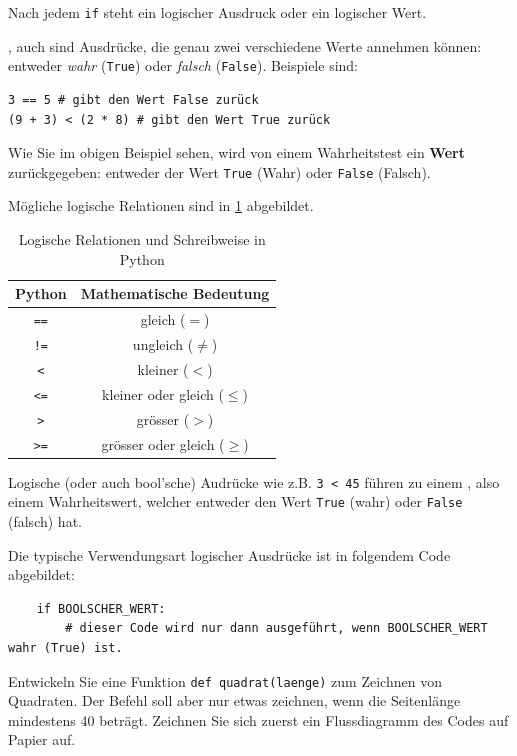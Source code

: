 Nach jedem \lstinline|if| steht ein logischer Ausdruck oder ein logischer Wert.

\begin{mydefinition}
, auch  sind Ausdrücke, die genau zwei verschiedene Werte annehmen können: entweder \textit{wahr} (\lstinline|True|) oder \textit{falsch} (\lstinline|False|). Beispiele sind:
\begin{lstlisting}
3 == 5 # gibt den Wert False zurück
(9 + 3) < (2 * 8) # gibt den Wert True zurück
\end{lstlisting}

Wie Sie im obigen Beispiel sehen, wird von einem Wahrheitstest ein \textbf{Wert} zurückgegeben: entweder der Wert \lstinline|True| (Wahr) oder \lstinline|False| (Falsch).

Mögliche logische Relationen sind in \cref{table:bool} abgebildet.
\begin{table}[H]
	\centering
	\begin{tabular}{c||c}
		\textbf{Python} & \textbf{Mathematische Bedeutung} \\\midrule
		\lstinline|==|  & gleich ($=$)                     \\
		\lstinline|!=|  & ungleich ($\neq$)                \\
		\lstinline|<|   & kleiner ($<$)                    \\
		\lstinline|<=|  & kleiner oder gleich ($\leq$)     \\
		\lstinline|>|   & grösser ($>$)                    \\
		\lstinline|>=|  & grösser oder gleich ($\geq$)
	\end{tabular}
	\caption{Logische Relationen und Schreibweise in Python}
	\label{table:bool}
\end{table}
Logische (oder auch bool'sche) Audrücke wie z.B. \lstinline|3 < 45| führen zu einem , also einem Wahrheitswert, welcher entweder den Wert \lstinline|True| (wahr) oder \lstinline|False| (falsch) hat.

Die typische Verwendungsart logischer Ausdrücke ist in folgendem Code abgebildet:
\begin{lstlisting}
	if BOOLSCHER_WERT:
		# dieser Code wird nur dann ausgeführt, wenn BOOLSCHER_WERT wahr (True) ist.
\end{lstlisting}
\end{mydefinition}



\begin{myexercise}
	Entwickeln Sie eine Funktion \lstinline|def quadrat(laenge)| zum Zeichnen von Quadraten. Der Befehl soll aber nur etwas zeichnen, wenn die Seitenlänge mindestens 40 beträgt. Zeichnen Sie sich zuerst ein Flussdiagramm des Codes auf Papier auf.
	\begin{myanswer}
		
	\end{myanswer}
\end{myexercise}

